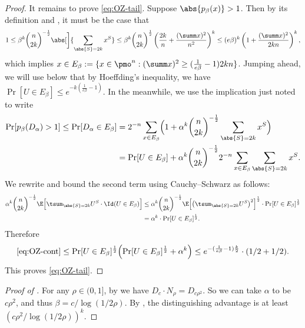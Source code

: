 \begin{proof}
    It remains to prove \cref{eq:OZ-tail}.
    Suppose $\abs{p_\beta(x)} > 1$.
    Then by its definition and , it must be the case that
    \[
      1 
      \le \beta^k \binom{n}{2k}^{-\frac{1}{2}} \abs[\bigg]{ \sum_{\abs{S}=2k} x^S }
      \le \beta^k \binom{n}{2k}^\frac{1}{2} \left(\frac{2k}{n} + \frac{(\summ x)^2}{n^2}\right)^k 
      \le (e \beta)^k \left(1 + \frac{(\summ x)^2}{2kn} \right)^k ,
    \]
    which implies  $x \in E_\beta := \{ x \in \pmo^n : (\summ x)^2 \ge (\frac{1}{e \beta} - 1) 2kn \}$.
    Jumping ahead, we will use below that by Hoeffding's inequality, we have $\Pr[U \in E_\beta] \le e^{-k (\frac{1}{e\beta}-1)}$.
    In the meanwhile, we use the implication just noted to write    
    \begin{align}
      \Pr[p_\beta(D_\alpha) > 1]
      \le \Pr[D_\alpha \in E_\beta]
      &= 2^{-n} \sum_{x \in E_\beta} \Bigl( 1 + \alpha^k \binom{n}{2k}^{-\frac{1}{2}} \sum_{\abs{S}=2k} x^S \Bigr) \nonumber \\
      &= \Pr[ U \in E_\beta] + \alpha^k \binom{n}{2k}^{-\frac{1}{2}} 2^{-n} \sum_{x \in E_\beta} \sum_{\abs{S}=2k} x^S . \label{eq:OZ-cont}
    \end{align}
    We rewrite and bound the second term using Cauchy--Schwarz as follows:
    \begin{align*}
      \alpha^k \binom{n}{2k}^{-\frac{1}{2}} \E\Bigl[ \tsum_{\abs{S}=2k} U^S \cdot \Id(U \in E_\beta)\Bigr]
      &\le
      \alpha^k \binom{n}{2k}^{-\frac{1}{2}} \E\Bigl[ \bigl( \tsum_{ \abs{S}=2k} U^S \bigr)^2 \Bigr]^{\frac{1}{2}}  \cdot \Pr[ U \in E_\beta ]^{\frac{1}{2}} \\
      &= \alpha^k \cdot \Pr[U \in E_\beta]^{\frac{1}{2}} .
    \end{align*}
    Therefore
    \[
      \cref{eq:OZ-cont}
      \le \Pr[ U \in E_\beta]^{\frac{1}{2}} \Bigl(\Pr[U \in E_\beta]^{\frac{1}{2}} + \alpha^k \Bigr) \\
      \le e^{-(\frac{1}{e\beta} - 1)\frac{k}{2}} \cdot (1/2 + 1/2) .
    \]
    This proves \cref{eq:OZ-tail}.
  \end{proof}

  \begin{proof}[Proof of ]
    For any $\rho \in (0,1]$, by  we have  $D_{c} \cdot N_\rho = D_{c\rho^2}$.
    So we can take $\alpha$ to be $c\rho^2$, and thus $\beta = c/\log(1/2\rho)$.
    By , the distinguishing advantage is at least $(c\rho^2/\log(1/2\rho))^k$.
  \end{proof}



